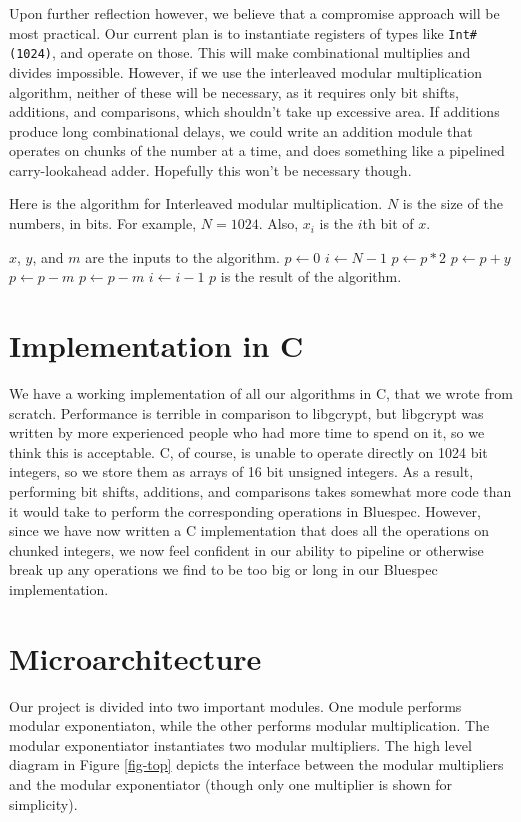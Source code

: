 \documentclass[12pt]{article}
\begin{document}
Upon further reflection however, we believe that a compromise approach will be most practical.
Our current plan is to instantiate registers of types like {\tt Int\#(1024)}, and operate on those.
This will make combinational multiplies and divides impossible.
However, if we use the interleaved modular multiplication algorithm,
neither of these will be necessary, as it requires only bit shifts, additions, and comparisons,
which shouldn't take up excessive area.
If additions produce long combinational delays,
we could write an addition module that operates on chunks of the number at a time,
and does something like a pipelined carry-lookahead adder.
Hopefully this won't be necessary though.

Here is the algorithm for Interleaved modular multiplication.
$N$ is the size of the numbers, in bits. For example, $N = 1024$.
Also, $x_i$ is the $i$th bit of $x$.
\begin{algorithmic}
\State $x$, $y$, and $m$ are the inputs to the algorithm.
\State $p \gets 0$
\State $i \gets N - 1$
	\State $p \gets p * 2$
		\State $p \gets p + y$
	\EndIf
		\State $p \gets p - m$
	\EndIf
		\State $p \gets p - m$
	\EndIf
  \State $i \gets i - 1$
\EndWhile
\State $p$ is the result of the algorithm.
\end{algorithmic}

\section{Implementation in C}
We have a working implementation of all our algorithms in C, that we wrote from scratch.
Performance is terrible in comparison to libgcrypt,
but libgcrypt was written by more experienced people who had more time to spend on it,
so we think this is acceptable.
C, of course, is unable to operate directly on 1024 bit integers,
so we store them as arrays of 16 bit unsigned integers.
As a result, performing bit shifts, additions, and comparisons
takes somewhat more code than it would take to perform the corresponding operations in Bluespec.
However, since we have now written a C implementation that does all the operations on chunked integers,
we now feel confident in our ability to pipeline or otherwise break up
any operations we find to be too big or long in our Bluespec implementation.

\section{Microarchitecture}
Our project is divided into two important modules.
One module performs modular exponentiaton,
while the other performs modular multiplication.
The modular exponentiator instantiates two modular multipliers.
The high level diagram in Figure \ref{fig-top} depicts the interface between
the modular multipliers and the modular exponentiator
(though only one multiplier is shown for simplicity).
\end{document}
